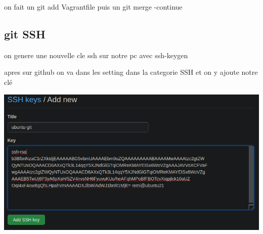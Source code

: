 \documentclass{article}
\begin{document}
 on fait un git add Vagrantfile puis un git merge -continue
 
 
 
 \subsection{\large{git SSH}}
 
 on genere une nouvelle cle ssh sur notre pc avec ssh-keygen \par
 
 apres sur github on va dans les setting dans la categorie SSH et on y ajoute notre clé
 
 \begin{center}
        \includegraphics[scale=0.5]{Images/sshgit.png}
 \end{center}
 
 
 
 
\end{document}
